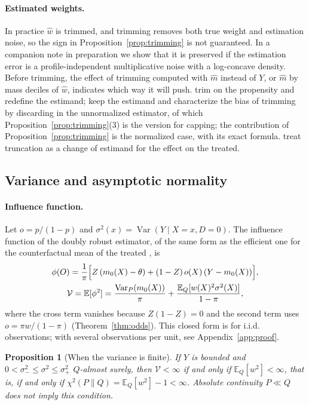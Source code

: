 \documentclass[twoside,11pt]{article}
\newcommand{\E}{\mathbb{E}}
\newcommand{\Var}{\operatorname{Var}}
\theoremstyle{plain}
\newtheorem{proposition}{Proposition}
\theoremstyle{definition}
\begin{document}
\paragraph{Estimated weights.} In practice $\hat w$ is trimmed, and trimming removes both true weight and estimation noise, so the sign in Proposition~\ref{prop:trimming} is not guaranteed. In a companion note in preparation we show that it is preserved if the estimation error is a profile-independent multiplicative noise with a log-concave density. Before trimming, the effect of trimming computed with $\hat m$ instead of $Y$, or $\hat m$ by mass deciles of $\hat w$, indicates which way it will push. \citet{crump2009} trim on the propensity and redefine the estimand; \citet{ma2020} keep the estimand and characterize the bias of trimming by discarding in the unnormalized estimator, of which Proposition~\ref{prop:trimming}(3) is the version for capping; the contribution of Proposition~\ref{prop:trimming} is the normalized case, with its exact formula. \citet{liu2023} treat truncation as a change of estimand for the effect on the treated.

\subsection{Variance and asymptotic normality}

\paragraph{Influence function.} Let $o=p/(1-p)$ and $\sigma^2(x)=\Var(Y\mid X=x,D=0)$. The influence function of the doubly robust estimator, of the same form as the efficient one for the counterfactual mean of the treated \citep{hahn1998}, is
\begin{gather*}
\phi(O)=\frac1\pi\Bigl[Z\,(m_0(X)-\theta)+(1-Z)\,o(X)\,(Y-m_0(X))\Bigr],\\
\mathcal V=\E[\phi^2]=\frac{\Var_P(m_0(X))}{\pi}+\frac{\E_Q[w(X)^2\sigma^2(X)]}{1-\pi},
\end{gather*}
where the cross term vanishes because $Z(1-Z)=0$ and the second term uses $o=\pi w/(1-\pi)$ (Theorem~\ref{thm:odds}). This closed form is for i.i.d. observations; with several observations per unit, see Appendix~\ref{app:proof}.

\begin{proposition}[When the variance is finite]\label{prop:variance}
If $Y$ is bounded and $0<\sigma_-^2\le\sigma^2\le\sigma_+^2$ $Q$-almost surely, then $\mathcal V<\infty$ if and only if $\E_Q[w^2]<\infty$, that is, if and only if $\chi^2(P\|Q)=\E_Q[w^2]-1<\infty$. Absolute continuity $P\ll Q$ does not imply this condition.
\end{proposition}
\end{document}
